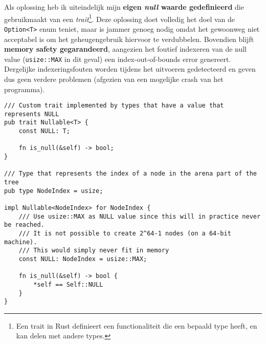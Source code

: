 Als oplossing heb ik uiteindelijk mijn \textbf{eigen \textit{null} waarde gedefinieerd} die gebruikmaakt van een \textit{trait}\footnote{Een trait in Rust definieert een functionaliteit die een bepaald type heeft, en kan delen met andere types.}.
Deze oplossing doet volledig het doel van de \texttt{Option<T>} enum teniet, maar is jammer genoeg nodig omdat het gewoonweg niet acceptabel is om het geheugengebruik hiervoor te verdubbelen.
Bovendien blijft \textbf{memory safety gegarandeerd}, aangezien het foutief indexeren van de null value (\texttt{usize::MAX} in dit geval) een index-out-of-bounds error genereert.
Dergelijke indexeringsfouten worden tijdens het uitvoeren gedetecteerd en geven dus geen verdere problemen (afgezien van een mogelijke crash van het programma).
\newpage
\begin{verbatim}
/// Custom trait implemented by types that have a value that represents NULL
pub trait Nullable<T> {
    const NULL: T;

    fn is_null(&self) -> bool;
}

/// Type that represents the index of a node in the arena part of the tree
pub type NodeIndex = usize;

impl Nullable<NodeIndex> for NodeIndex {
    /// Use usize::MAX as NULL value since this will in practice never be reached.
    /// It is not possible to create 2^64-1 nodes (on a 64-bit machine).
    /// This would simply never fit in memory
    const NULL: NodeIndex = usize::MAX;

    fn is_null(&self) -> bool {
        *self == Self::NULL
    }
}
\end{verbatim}

